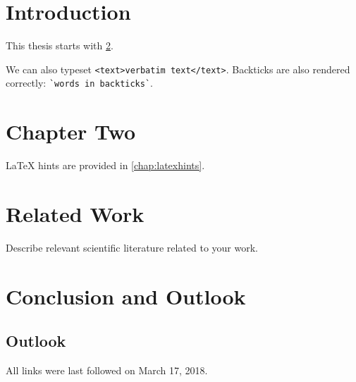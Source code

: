 \documentclass[
  a4paper,  %
  twoside,  %
  bibliography=totoc,
  headsepline,
  cleardoublepage=empty,
  parskip=half,
  draft=false
]{scrbook}
\begin{document}
\chapter{Introduction}

This thesis starts with \cref{chap:k2}.

We can also typeset \verb|<text>verbatim text</text>|.
Backticks are also rendered correctly: \verb|`words in backticks`|.

\chapter{Chapter Two}
\label{chap:k2}

LaTeX hints are provided in \cref{chap:latexhints}.

\blinddocument

\chapter{Related Work}

Describe relevant scientific literature related to your work.

\chapter{Conclusion and Outlook}
\label{chap:zusfas}

\section*{Outlook}

\printbibliography

All links were last followed on March 17, 2018.

\appendix


\pagestyle{empty}
\renewcommand*{\chapterpagestyle}{empty}
\Versicherung
\end{document}
